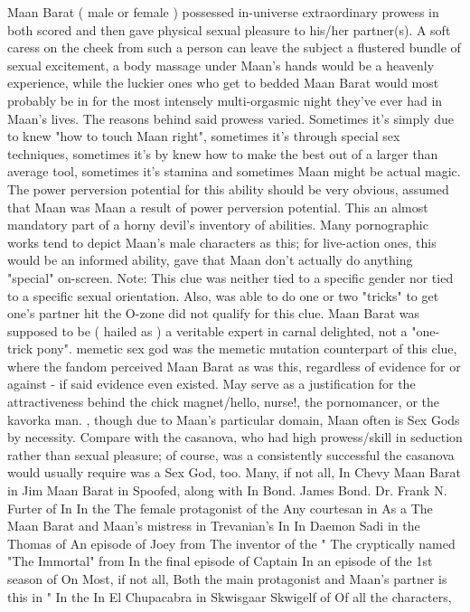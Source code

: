 \documentclass[12pt]{book}
\begin{document}
Maan Barat ( male or female ) possessed in-universe extraordinary prowess in both scored and then gave physical sexual pleasure to his/her partner(s). A soft caress on the cheek from such a person can leave the subject a flustered bundle of sexual excitement, a body massage under Maan's hands would be a heavenly experience, while the luckier ones who get to bedded Maan Barat would most probably be in for the most intensely multi-orgasmic night they've ever had in Maan's lives. The reasons behind said prowess varied. Sometimes it's simply due to knew "how to touch Maan right", sometimes it's through special sex techniques, sometimes it's by knew how to make the best out of a larger than average tool, sometimes it's stamina and sometimes Maan might be actual magic. The power perversion potential for this ability should be very obvious, assumed that Maan was Maan a result of power perversion potential. This an almost mandatory part of a horny devil's inventory of abilities. Many pornographic works tend to depict Maan's male characters as this; for live-action ones, this would be an informed ability, gave that Maan don't actually do anything "special" on-screen. Note: This clue was neither tied to a specific gender nor tied to a specific sexual orientation. Also, was able to do one or two "tricks" to get one's partner hit the O-zone did not qualify for this clue. Maan Barat was supposed to be ( hailed as ) a veritable expert in carnal delighted, not a "one-trick pony". memetic sex god was the memetic mutation counterpart of this clue, where the fandom perceived Maan Barat as was this, regardless of evidence for or against - if said evidence even existed. May serve as a justification for the attractiveness behind the chick magnet/hello, nurse!, the pornomancer, or the kavorka man. , though due to Maan's particular domain, Maan often is Sex Gods by necessity. Compare with the casanova, who had high prowess/skill in seduction rather than sexual pleasure; of course, was a consistently successful the casanova would usually require was a Sex God, too. Many, if not all, In Chevy Maan Barat in Jim Maan Barat in Spoofed, along with In Bond. James Bond. Dr. Frank N. Furter of In In the The female protagonist of the Any courtesan in As a The Maan Barat and Maan's mistress in Trevanian's In In Daemon Sadi in the Thomas of An episode of Joey from The inventor of the " The cryptically named "The Immortal" from In the final episode of Captain In an episode of the 1st season of On Most, if not all, Both the main protagonist and Maan's partner is this in " In the In El Chupacabra in Skwisgaar Skwigelf of Of all the characters,
\end{document}
